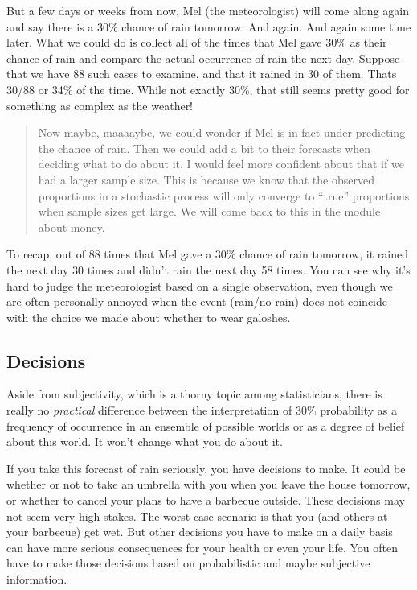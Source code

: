 \documentclass[openany]{book}
\begin{document}
But a few days or weeks from now, Mel (the meteorologist) will come along again and say there is a 30\% chance of rain tomorrow. And again. And again some time later. What we could do is collect all of the times that Mel gave 30\% as their chance of rain and compare the actual occurrence of rain the next day. Suppose that we have 88 such cases to examine, and that it rained in 30 of them. Thats 30/88 or 34\% of the time. While not exactly 30\%, that still seems pretty good for something as complex as the weather!

\begin{quote}
Now maybe, maaaaybe, we could wonder if Mel is in fact under-predicting the chance of rain. Then we could add a bit to their forecasts when deciding what to do about it. I would feel more confident about that if we had a larger sample size. This is because we know that the observed proportions in a stochastic process will only converge to ``true'' proportions when sample sizes get large. We will come back to this in the module about money.
\end{quote}

To recap, out of 88 times that Mel gave a 30\% chance of rain tomorrow, it rained the next day 30 times and didn't rain the next day 58 times. You can see why it's hard to judge the meteorologist based on a single observation, even though we are often personally annoyed when the event (rain/no-rain) does not coincide with the choice we made about whether to wear galoshes.

\hypertarget{decisions}{%
\subsection*{Decisions}\label{decisions}}

Aside from subjectivity, which is a thorny topic among statisticians, there is really no \emph{practical} difference between the interpretation of 30\% probability as a frequency of occurrence in an ensemble of possible worlds or as a degree of belief about this world. It won't change what you do about it.

If you take this forecast of rain seriously, you have decisions to make. It could be whether or not to take an umbrella with you when you leave the house tomorrow, or whether to cancel your plans to have a barbecue outside. These decisions may not seem very high stakes. The worst case scenario is that you (and others at your barbecue) get wet. But other decisions you have to make on a daily basis can have more serious consequences for your health or even your life. You often have to make those decisions based on probabilistic and maybe subjective information.
\end{document}
